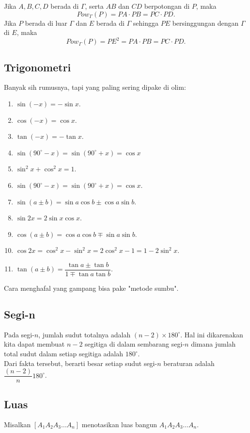 Jika $A,B,C,D$ berada di $\Gamma$, serta $AB$ dan $CD$ berpotongan di $P$, maka $$Pow_\Gamma(P)=PA \cdot PB = PC \cdot PD.$$
Jika $P$ berada di luar $\Gamma$ dan $E$ berada di $\Gamma$ sehingga $PE$ bersinggungan dengan $\Gamma$ di $E$, maka $$Pow_\Gamma (P) = PE^2 =  PA \cdot PB = PC \cdot PD.$$

\subsection{Trigonometri}
Banyak sih rumusnya, tapi yang paling sering dipake di olim:
\begin{enumerate}
    \item $\sin (-x) = -\sin x$.
    \item $\cos (-x) = \cos x$.
    \item $\tan(-x) = -\tan x$.
    \item $\sin (90^\circ-x) = \sin(90^\circ+x)=\cos x$
    \item $\sin^2 x + \cos^2 x = 1$.
    \item $\sin(90^\circ-x)=\sin(90^\circ+x)=\cos x$.
    \item $\sin(a \pm b) = \sin a \cos b \pm \cos a \sin b$.
    \item $\sin 2x = 2\sin x \cos x$.
    \item $\cos(a \pm b) = \cos a \cos b \mp \sin a \sin b$.
    \item $\cos 2x = \cos^2 x - \sin^2 x = 2\cos^2 x -1 = 1-2\sin^2 x$.
    \item $\tan(a \pm b) = \dfrac{\tan a \pm \tan b}{1 \mp \tan a \tan b}$.
\end{enumerate}
Cara menghafal yang gampang bisa pake "metode sumbu".

\subsection{Segi-n}
Pada segi-$n$, jumlah sudut totalnya adalah $(n-2)\times 180^\circ$. Hal ini dikarenakan kita dapat membuat $n-2$ segitiga di dalam sembarang segi-$n$ dimana jumlah total sudut dalam setiap segitiga adalah $180^\circ$.\\

Dari fakta tersebut, berarti besar setiap sudut segi-$n$ beraturan adalah $\dfrac{(n-2)}{n}180^\circ$.
\subsection{Luas}
Misalkan $[A_1A_2A_3\dots A_n]$ menotasikan luas bangun $A_1A_2A_3\dots A_n$. 

